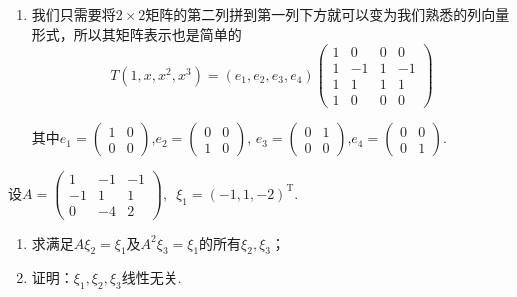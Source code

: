 \begin{exercise}
\begin{exgroup}
\begin{answer}
\begin{enumerate}
                \item 我们只需要将$2 \times 2$矩阵的第二列拼到第一列下方就可以变为我们熟悉的列向量形式，所以其矩阵表示也是简单的
                      \[
                        T(1,x,x^2,x^3)=(e_1,e_2,e_3,e_4)\begin{pmatrix}
                            1 & 0 & 0 & 0 \\
                            1 & -1 & 1 & -1 \\
                            1 & 1 & 1 & 1 \\
                            1 & 0 & 0 & 0
                        \end{pmatrix}
                      \]

                      其中$e_1=\begin{pmatrix}1&0\\0&0\end{pmatrix}$,$e_2=\begin{pmatrix}0&0\\1&0\end{pmatrix}$,
                      $e_3=\begin{pmatrix}0&1\\0&0\end{pmatrix}$,$e_4=\begin{pmatrix}0&0\\0&1\end{pmatrix}$.
            \end{enumerate}
        \end{answer}

        \item 设$A=\begin{pmatrix}
                1 & -1 & -1 \\ -1 & 1 & 1 \\ 0 & -4 & 2
            \end{pmatrix},\enspace\xi_1=(-1,1,-2)^\mathrm{T}$.
        \begin{enumerate}
            \item 求满足$A\xi_2=\xi_1$及$A^2\xi_3=\xi_1$的所有$\xi_2,\xi_3$；

            \item 证明：$\xi_1,\xi_2,\xi_3$线性无关.
        \end{enumerate}


\end{exgroup}
\end{exercise}
